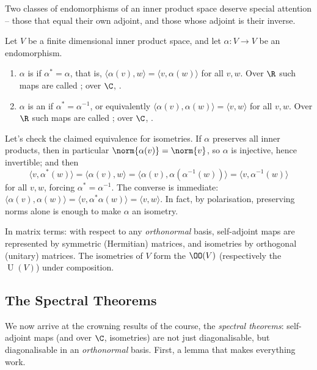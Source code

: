 Two classes of endomorphisms of an inner product space deserve special attention -- those that equal their own adjoint, and those whose adjoint is their inverse.

\begin{definition}
    Let $V$ be a finite dimensional inner product space, and let $\alpha: V \rightarrow V$ be an endomorphism.
    \begin{enumerate}[label=(\roman*)]
        \item $\alpha$ is  if $\alpha^* = \alpha$, that is, $\langle \alpha(v), w \rangle = \langle v, \alpha(w)\rangle$ for all $v, w$. Over $\R$ such maps are called ; over $\C$, .
        \item $\alpha$ is an  if $\alpha^* = \alpha^{-1}$, or equivalently $\langle \alpha(v), \alpha(w)\rangle = \langle v, w \rangle$ for all $v, w$. Over $\R$ such maps are called ; over $\C$, .
    \end{enumerate}
\end{definition}

Let's check the claimed equivalence for isometries. If $\alpha$ preserves all inner products, then in particular $\norm{\alpha(v)} = \norm{v}$, so $\alpha$ is injective, hence invertible; and then
$$
\langle v, \alpha^*(w)\rangle = \langle \alpha(v), w \rangle = \langle \alpha(v), \alpha(\alpha^{-1}(w))\rangle = \langle v, \alpha^{-1}(w)\rangle
$$
for all $v, w$, forcing $\alpha^* = \alpha^{-1}$. The converse is immediate: $\langle \alpha(v), \alpha(w)\rangle = \langle v, \alpha^*\alpha(w)\rangle = \langle v, w \rangle$. In fact, by polarisation, preserving norms alone is enough to make $\alpha$ an isometry.

In matrix terms: with respect to any \emph{orthonormal} basis, self-adjoint maps are represented by symmetric (Hermitian) matrices, and isometries by orthogonal (unitary) matrices. The isometries of $V$ form the  $\OO(V)$ (respectively the  $\operatorname{U}(V)$) under composition.

\subsection{The Spectral Theorems}

We now arrive at the crowning results of the course, the \emph{spectral theorems}: self-adjoint maps (and over $\C$, isometries) are not just diagonalisable, but diagonalisable in an \emph{orthonormal} basis. First, a lemma that makes everything work.


